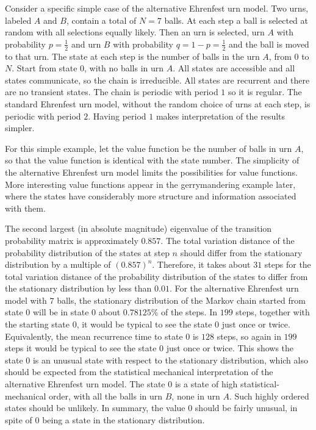 \documentclass[12pt]{article}
\begin{document}
\begin{example}
    Consider a specific simple case of the alternative Ehrenfest urn
    model.%
    Two urns, labeled \( A \) and \( B \), contain a total of \( N = 7 \)
    balls.  At each step a ball is selected at random with all
    selections equally likely.  Then an urn is selected, urn \( A \)
    with probability \( p = \frac{1}{2} \) and urn \( B \) with
    probability \( q = 1-p = \frac {1}{2} \) and the ball is moved to
    that urn.  The state at each step is the number of balls in the urn \(
    A \), from \( 0 \) to \( N \).  Start from state \( 0 \), with no
    balls in urn \( A \).  All states are accessible and all states
    communicate, so the chain is irreducible.  All states are recurrent
    and there are no transient states.  The chain is periodic with
    period \( 1 \) so it is regular.  The standard Ehrenfest urn model,
    without the random choice of urns at each step, is periodic with
    period \( 2 \).  Having period \( 1 \) makes interpretation of the
    results simpler.

    For this simple example, let the value function be the number of
    balls in urn \( A \), so that the value function is identical with
    the state number.  The simplicity of the alternative Ehrenfest urn
    model limits the possibilities for value functions.  More
    interesting value functions appear in the gerrymandering example
    later, where the states have considerably more structure and
    information associated with them.

    The second largest (in absolute magnitude) eigenvalue of the
    transition probability matrix is approximately \( 0.857 \).  The
    total variation distance of the probability distribution of the
    states at step \( n \) should differ from the stationary
    distribution by a multiple of \( (0.857)^n \).  Therefore, it takes
    about \( 31 \) steps for the total variation distance of the
    probability distribution of the states to differ from the stationary
    distribution by less than \( 0.01 \).  For the alternative Ehrenfest
    urn model with \( 7 \) balls, the stationary distribution of the
    Markov chain started from state \( 0 \) will be in state \( 0 \)
    about \( 0.78125\% \) of the steps.  In \( 199 \) steps, together
    with the starting state \( 0 \), it would be typical to see the
    state \( 0 \) just once or twice.  Equivalently, the mean recurrence
    time to state \( 0 \) is \( 128 \) steps, so again in \( 199 \)
    steps it would be typical to see the state \( 0 \) just once or
    twice.  This shows the state \( 0 \) is an unusual state with
    respect to the stationary distribution, which also should be
    expected from the statistical mechanical interpretation of the
    alternative Ehrenfest urn model.  The state \( 0 \) is a state of
    high statistical-mechanical order, with all the balls in urn \( B \),
    none in urn \( A \).  Such highly ordered states should be unlikely.
    In summary, the value \( 0 \) should be fairly unusual, in spite of \(
    0 \) being a state in the stationary distribution.


\end{example}
\end{document}
